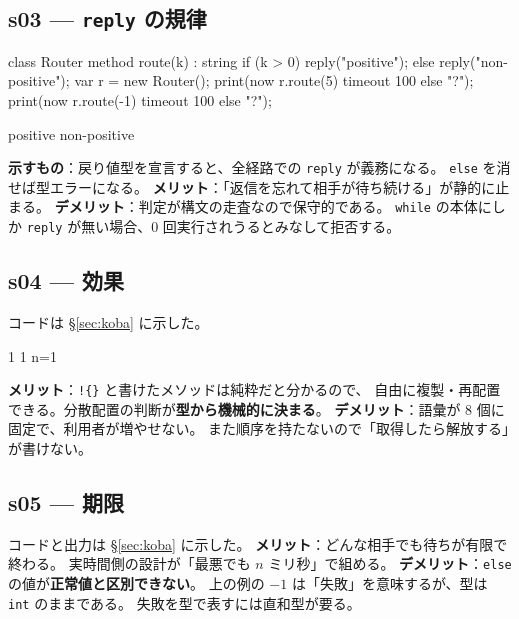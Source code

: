 \documentclass[11pt,a4paper]{ltjsarticle}
\theoremstyle{definition}
\theoremstyle{remark}
\begin{document}
\subsection{s03 --- \texttt{reply} の規律}
\begin{aipl}
class Router {
  method route(k) : string {
    if (k > 0) { reply("positive"); } else { reply("non-positive"); }
  }
}
var r = new Router();
print(now r.route(5)  timeout 100 else "?");
print(now r.route(-1) timeout 100 else "?");
\end{aipl}
\begin{term}
positive
non-positive
\end{term}
\textbf{示すもの}：戻り値型を宣言すると、全経路での \texttt{reply} が義務になる。
\texttt{else} を消せば型エラーになる。
\textbf{メリット}：「返信を忘れて相手が待ち続ける」が静的に止まる。
\textbf{デメリット}：判定が構文の走査なので保守的である。
\texttt{while} の本体にしか \texttt{reply} が無い場合、0 回実行されうるとみなして拒否する。

\subsection{s04 --- 効果}
コードは \S\ref{sec:koba} に示した。
\begin{term}
1
1
n=1
\end{term}
\textbf{メリット}：\texttt{!\{\}} と書けたメソッドは純粋だと分かるので、
自由に複製・再配置できる。分散配置の判断が\textbf{型から機械的に決まる}。
\textbf{デメリット}：語彙が 8 個に固定で、利用者が増やせない。
また順序を持たないので「取得したら解放する」が書けない。

\subsection{s05 --- 期限}
コードと出力は \S\ref{sec:koba} に示した。
\textbf{メリット}：どんな相手でも待ちが有限で終わる。
実時間側の設計が「最悪でも $n$ ミリ秒」で組める。
\textbf{デメリット}：\texttt{else} の値が\textbf{正常値と区別できない}。
上の例の $-1$ は「失敗」を意味するが、型は \texttt{int} のままである。
失敗を型で表すには直和型が要る。
\end{document}
